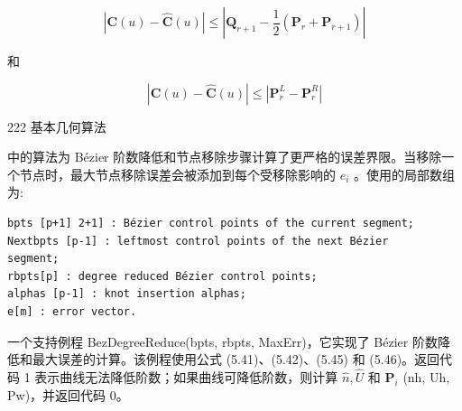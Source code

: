 \documentclass[../main.tex]{subfiles}
\begin{document}
\[
\left| {\mathbf{C}\left( u\right)  - \widehat{\mathbf{C}}\left( u\right) }\right|  \leq  \left| {{\mathbf{Q}}_{r + 1} - \frac{1}{2}\left( {{\mathbf{P}}_{r} + {\mathbf{P}}_{r + 1}}\right) }\right|  \tag{5.45}
\]

和

\[
\left| {\mathbf{C}\left( u\right)  - \widehat{\mathbf{C}}\left( u\right) }\right|  \leq  \left| {{\mathbf{P}}_{r}^{L} - {\mathbf{P}}_{r}^{R}}\right|  \tag{5.46}
\]

222 基本几何算法



\cite{Pieg95} 中的算法为 Bézier 阶数降低和节点移除步骤计算了更严格的误差界限。当移除一个节点时，最大节点移除误差会被添加到每个受移除影响的 \({e}_{i}\) 。使用的局部数组为:

\begin{verbatim}
bpts [p+1] 2+1] : Bézier control points of the current segment;
Nextbpts [p-1] : leftmost control points of the next Bézier
segment;
rbpts[p] : degree reduced Bézier control points;
alphas [p-1] : knot insertion alphas;
e[m] : error vector.
\end{verbatim}

一个支持例程 BezDegreeReduce(bpts, rbpts, MaxErr)，它实现了 Bézier 阶数降低和最大误差的计算。该例程使用公式 (5.41)、(5.42)、(5.45) 和 (5.46)。返回代码 1 表示曲线无法降低阶数；如果曲线可降低阶数，则计算 \(\widehat{n},\widehat{U}\) 和 \({\mathbf{P}}_{i}\) (nh, Uh, Pw)，并返回代码 0。
\end{document}
